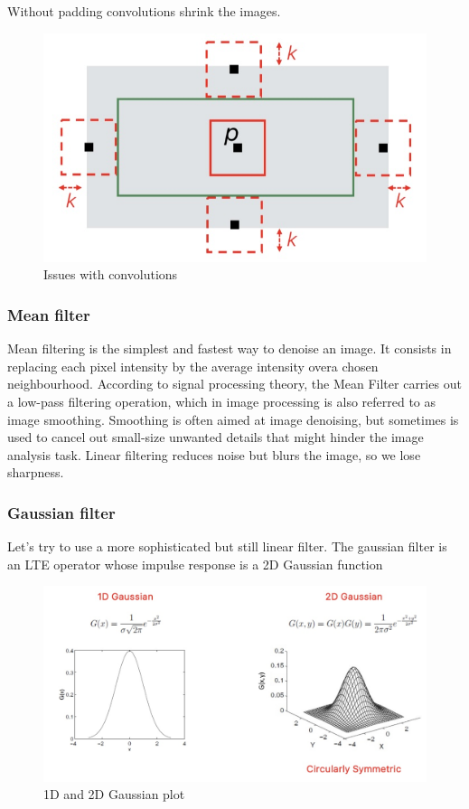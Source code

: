 \documentclass{article}
\begin{document}
Without padding convolutions shrink the images.

\begin{figure}[htbp]
  \centering
  \includegraphics[width=0.7\linewidth]{./img/convolution_visualization.jpg}
  \caption{Issues with convolutions}
  \label{fig:convolution_visualization}
\end{figure}

\subsubsection{Mean filter}

Mean filtering is the simplest and fastest way to denoise an image.
It consists in replacing each pixel intensity by the average intensity overa chosen neighbourhood.
According to signal processing theory, the Mean Filter carries out a low-pass filtering operation, which in image processing is also referred to as image smoothing.
Smoothing is often aimed at image denoising, but sometimes is used to cancel out small-size unwanted details that might hinder the image analysis task.
Linear filtering reduces noise but blurs the image, so we lose sharpness.

\subsubsection{Gaussian filter}

Let's try to use a more sophisticated but still linear filter.
The gaussian filter is an LTE operator whose impulse response is a 2D Gaussian function 

\begin{figure}[htbp]
  \centering
  \includegraphics[width=0.7\linewidth]{./img/gaussian_filter.jpg}
  \caption{1D and 2D Gaussian plot}
  \label{fig:gaussian_filter}
\end{figure}
\end{document}
